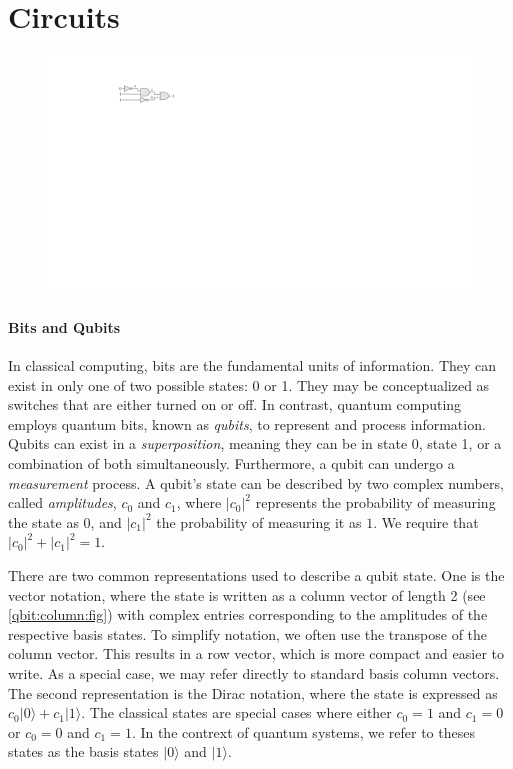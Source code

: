 \section{Circuits} 
\begin{figure} 
\includegraphics[]{Figures/HWCircuits/DigitalCircuit} 
\end{figure}

\newcommand\bstate{b}
\newcommand\qustate{q}

\paragraph{Bits and Qubits}
In classical computing, bits are the fundamental units of information. 
%
They can exist in only one of two possible states: 0 or 1. 
%
They may be conceptualized as switches that are either turned on or off. 
%
In contrast, quantum computing employs quantum bits, known as {\it qubits}, to represent and process information. 
%
Qubits can exist in a {\it superposition}, meaning they can be in state 0, state 1, or a combination of both simultaneously. 
%
Furthermore, a qubit can undergo a {\it measurement} process. 
%
A qubit’s state can be described by two complex numbers, called {\it amplitudes}, $c_0$ and $c_1$, where $|c_0|^2$ represents the probability of measuring the state as $0$, and $|c_1|^2$ the probability of measuring it as $1$. 
%
We require that $|c_0|^2 + |c_1|^2 = 1$.

There are two common representations used to describe a qubit state.
%
One is the vector notation, where the state is written as a column vector of length 2 (see \cref{qbit:column:fig}) with complex entries corresponding to the amplitudes of the respective basis states.
%
To simplify notation, we often use the transpose of the column vector.
%
This results in a row vector, which is more compact and easier to write.
%
As a special case, we may refer directly to standard basis column vectors.
%
The second representation is the Dirac notation, where the state is expressed as $c_0|0\rangle + c_1|1\rangle$.
%
The classical states are special cases where either $c_0=1$ and $c_1=0$ or
$c_0=0$ and $c_1=1$.
%
In the contrext of quantum systems, we refer to theses states as the basis states $|0\rangle$ and $|1\rangle$.


